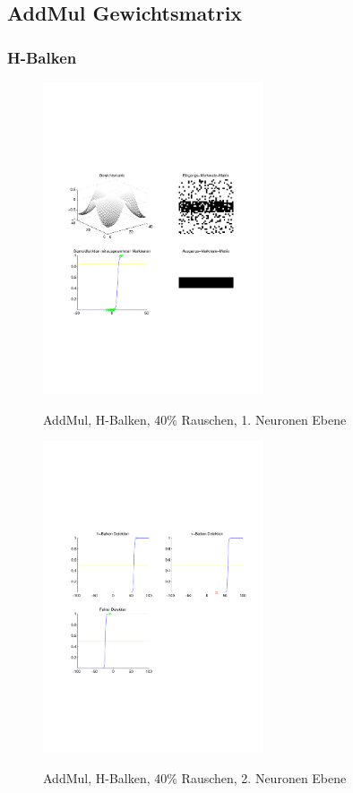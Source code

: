 \newpage
\subsection{AddMul Gewichtsmatrix}
\subsubsection{H-Balken}
\begin{figure}[hbt]
	\begin{minipage}[c]{\textwidth}
		\centering
       	\includegraphics[trim=71 213 43 212, clip, width=0.58\textwidth]{./Bilder/Auswertung/Endergebnis/TypeAddMul_Rauschen40_H_Line_Layer1}
		\caption{AddMul, H-Balken, 40\% Rauschen, 1. Neuronen Ebene}
		\label{AddMul_H_40_1}
		\vfill
		\includegraphics[trim=71 213 43 212, clip, width=0.58\textwidth]{./Bilder/Auswertung/Endergebnis/TypeAddMul_Rauschen40_H_Line_Layer2}
		\caption{AddMul, H-Balken, 40\% Rauschen, 2. Neuronen Ebene}
		\label{AddMul_H_40_2}
	\end{minipage}
\end{figure}


